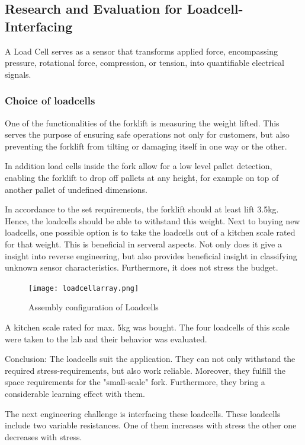 \documentclass[../report.tex]{subfiles}
\begin{document}
\subsection{Research and Evaluation for Loadcell-Interfacing}
A Load Cell serves as a sensor that transforms applied force, encompassing pressure, rotational force, compression,
or tension, into quantifiable electrical signals.

\subsubsection{Choice of loadcells}

One of the functionalities of the forklift is measuring the weight lifted.
This serves the purpose of ensuring safe operations not only for customers, 
but also preventing the forklift from tilting or damaging itself in one way or the other.

In addition load cells inside the fork allow for a low level pallet detection, enabling 
the forklift to drop off pallets at any height, for example on top of another pallet of undefined 
dimensions. 

In accordance to the set requirements, the forklift should at least lift 3.5kg.
Hence, the loadcells should be able to withstand this weight. 
Next to buying new loadcells, one possible option is to take the loadcells
out of a kitchen scale rated for that weight. This is beneficial in serveral aspects.
Not only does it give a insight into reverse engineering, but also provides beneficial
insight in classifying unknown sensor characteristics. Furthermore, it does not 
stress the budget. 

\begin{figure}[H]
  \centering
  \texttt{[image: loadcellarray.png]}
  \caption{Assembly configuration of Loadcells}
\end{figure}

A kitchen scale rated for max. 5kg was bought. The four loadcells of this scale were taken to the lab and
their behavior was evaluated. 

Conclusion: The loadcells suit the application. They can not only withstand the
required stress-requirements, but also work reliable. Moreover, they fulfill the 
space requirements for the "small-scale" fork. Furthermore, they bring a considerable
learning effect with them.

The next engineering challenge is interfacing these loadcells.
These loadcells include two variable resistances. One of them increases
with stress the other one decreases with stress. 
\end{document}
